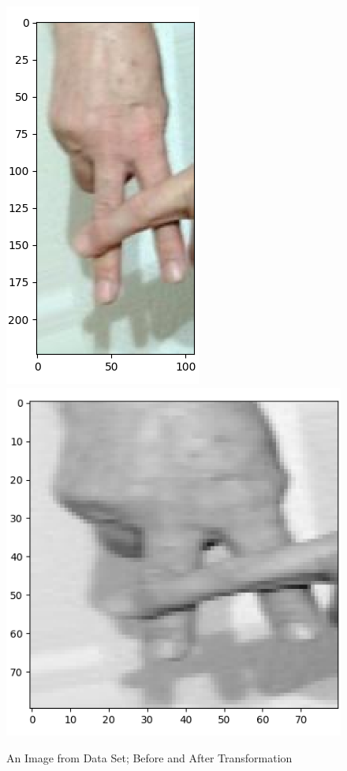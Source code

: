 \documentclass{article}
\begin{document}
\begin{flushleft}
\begin{figure}[h]
    \centering
    \includegraphics[scale=0.5]{images/A_original_2.png}
    \includegraphics[scale=0.5]{images/A_transformed_2.png}
    \caption{An Image from Data Set; Before and After Transformation}
    \label{fig:transformed_A}
\end{figure}


\end{flushleft}
\end{document}
